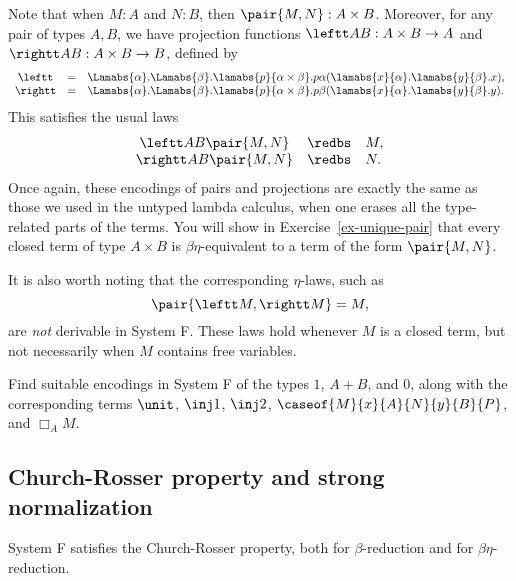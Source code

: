 \documentclass[12pt]{article}
\begin{document}
Note that when $M:A$ and $N:B$, then $\pair{M,N}:A\times B$. Moreover,
for any pair of types $A,B$, we have projection
functions $\leftt AB : A\times B\to A$ and $\rightt AB : A\times B\to
B$, defined by
\[ \begin{array}{ccl}
  \leftt &=& \Lamabs{\alpha}.\Lamabs{\beta}.\lamabs{p}{\alpha\times
    \beta}.p\alpha(\lamabs{x}{\alpha}.\lamabs{y}{\beta}.x),\\
  \rightt &=& \Lamabs{\alpha}.\Lamabs{\beta}.\lamabs{p}{\alpha\times
    \beta}.p\beta(\lamabs{x}{\alpha}.\lamabs{y}{\beta}.y).
\end{array}
\]
This satisfies the usual laws
\[ \begin{array}{ccl}
  \leftt AB\pair{M,N} &\redbs& M,\\
  \rightt AB\pair{M,N} &\redbs& N.
\end{array}
\]
Once again, these encodings of pairs and projections are exactly the
same as those we used in the untyped lambda calculus, when one erases
all the type-related parts of the terms. You will show in
Exercise~\ref{ex-unique-pair} that every closed term of type $A\times
B$ is $\beta\eta$-equivalent to a term of the form $\pair{M,N}$.

\begin{remark}
  It is also worth noting that the corresponding $\eta$-laws, such as
  \[  \pair{\leftt M,\rightt M}=M,
  \] are {\em not} derivable in System F. These laws hold whenever $M$
  is a closed term, but not necessarily when $M$ contains free
  variables.
\end{remark}

\begin{exercise}\label{ex-encodings}
  Find suitable encodings in System F of the types $1$, $A+B$, and
  $0$, along with the corresponding terms $\unit$, $\inj1$, $\inj2$,
  $\caseof{M}{x}{A}{N}{y}{B}{P}$, and $\Box_A{M}$.
\end{exercise}

\subsection{Church-Rosser property and strong normalization}

\begin{theorem}
  System F satisfies the Church-Rosser property, both for
  $\beta$-reduction and for $\beta\eta$-reduction.
\end{theorem}
\end{document}
